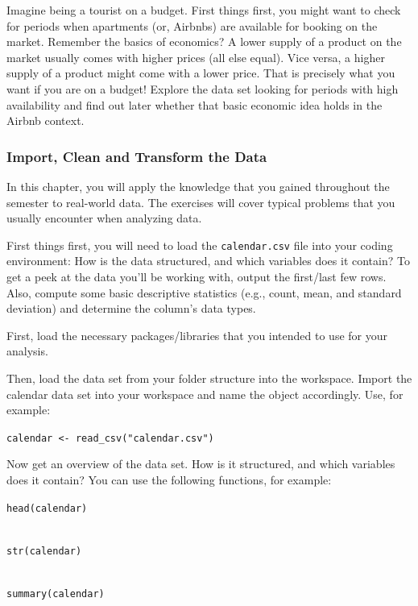 \documentclass[
  11pt,
]{article}
\newenvironment{tips}[1]
  {
  \begin{itemize}
  \footnotesize
  \renewcommand{\labelitemi}{
    \raisebox{-.7\height}[0pt][0pt]{
      {\setkeys{Gin}{width=3em,keepaspectratio}
        \texttt{[image: images/\#1.png]}}
    }
  }
  \setlength{\fboxsep}{1em}
  \begin{rbox}
  \item
  }
  {
  \end{rbox}
  \end{itemize}
  }
\begin{document}
Imagine being a tourist on a budget.
First things first, you might want to check for periods when apartments (or, Airbnbs) are available for booking on the market.
Remember the basics of economics?
A lower supply of a product on the market usually comes with higher prices (all else equal).
Vice versa, a higher supply of a product might come with a lower price.
That is precisely what you want if you are on a budget!
Explore the data set looking for periods with high availability and find out later whether that basic economic idea holds in the Airbnb context.

\hypertarget{import-clean-and-transform-the-data}{%
\subsubsection{Import, Clean and Transform the Data}\label{import-clean-and-transform-the-data}}

In this chapter, you will apply the knowledge that you gained throughout the semester to real-world data.
The exercises will cover typical problems that you usually encounter when analyzing data.

First things first, you will need to load the \texttt{calendar.csv} file into your coding environment: How is the data structured, and which variables does it contain?
To get a peek at the data you'll be working with, output the first/last few rows.
Also, compute some basic descriptive statistics (e.g., count, mean, and standard deviation) and determine the column's data types.

\begin{tips}r
First, load the necessary packages/libraries that you intended to use for your analysis.

Then, load the data set from your folder structure into the workspace.
Import the calendar data set into your workspace and name the object accordingly.
Use, for example:

\texttt{calendar\ \textless{}-\ read\_csv("calendar.csv")}

Now get an overview of the data set.
How is it structured, and which variables does it contain?
You can use the following functions, for example:

\texttt{head(calendar)}\strut \\
\texttt{str(calendar)}\strut \\
\texttt{summary(calendar)}

\end{tips}
\end{document}
